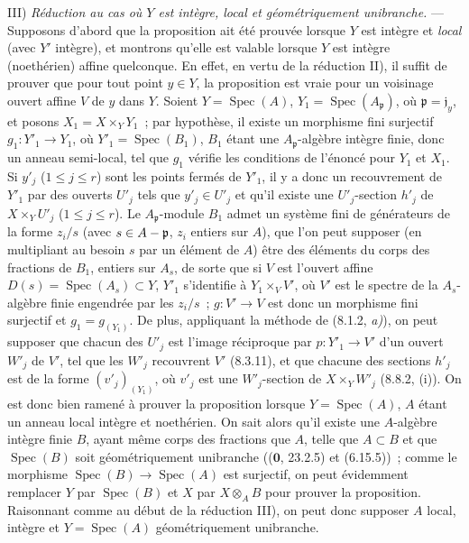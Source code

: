 III) \emph{Réduction au cas où $Y$ est intègre, local et géométriquement
unibranche.} --- Supposons d'abord que la proposition ait été prouvée lorsque $Y$
est intègre et \emph{local} (avec $Y'$ intègre), et montrons qu'elle est valable
lorsque $Y$ est intègre (noethérien) affine quelconque. En effet, en vertu de la
réduction II), il suffit de prouver que pour tout point $y\in Y$, la proposition est
vraie pour un voisinage ouvert affine $V$ de $y$ dans $Y$. Soient $Y=\operatorname{Spec}(A)$,
$Y_1=\operatorname{Spec}(A_{\mathfrak p})$, où $\mathfrak p=\mathfrak j_y$, et posons
$X_1=X\times_Y Y_1$~; par hypothèse, il existe un morphisme fini surjectif
$g_1:Y'_1\to Y_1$, où $Y'_1=\operatorname{Spec}(B_1)$, $B_1$ étant une
$A_{\mathfrak p}$-algèbre intègre finie, donc un anneau semi-local, tel que $g_1$
vérifie les conditions de l'énoncé pour $Y_1$ et $X_1$. Si $y'_j$
($1\leq j\leq r$) sont les points fermés de $Y'_1$, il y a donc un recouvrement de
$Y'_1$ par des ouverts $U'_j$ tels que $y'_j\in U'_j$ et qu'il existe une
$U'_j$-section $h'_j$ de $X\times_Y U'_j$ ($1\leq j\leq r$). Le
$A_{\mathfrak p}$-module $B_1$ admet un système fini de générateurs de la forme
$z_i/s$ (avec $s\in A-\mathfrak p$,
$z_i$ entiers sur $A$), que l'on peut supposer (en multipliant au besoin $s$ par un
élément de $A$) être des éléments du corps des fractions de $B_1$, entiers sur
$A_s$, de sorte que si $V$ est l'ouvert affine $D(s)=\operatorname{Spec}(A_s)\subset Y$, $Y'_1$
s'identifie à $Y_1\times_V V'$, où $V'$ est le spectre de la $A_s$-algèbre finie
engendrée par les $z_i/s$~; $g:V'\to V$ est donc un morphisme fini surjectif et
$g_1=g_{(Y_1)}$. De plus, appliquant la méthode de (8.1.2, \emph{a)}), on peut supposer
que chacun des $U'_j$ est l'image réciproque par $p:Y'_1\to V'$ d'un ouvert $W'_j$
de $V'$, tel que les $W'_j$ recouvrent $V'$ (8.3.11), et que chacune des sections
$h'_j$ est de la forme $(v'_j)_{(Y_1)}$, où $v'_j$ est une $W'_j$-section de
$X\times_Y W'_j$ (8.8.2, (i)). On est donc bien ramené à prouver la proposition
lorsque $Y=\operatorname{Spec}(A)$, $A$ étant un anneau local intègre et noethérien. On sait alors
qu'il existe une $A$-algèbre intègre finie $B$, ayant même corps des fractions que
$A$, telle que $A\subset B$ et que $\operatorname{Spec}(B)$ soit géométriquement unibranche
(($\mathbf 0$, 23.2.5) et (6.15.5))~; comme le morphisme
$\operatorname{Spec}(B)\to\operatorname{Spec}(A)$ est surjectif, on peut évidemment remplacer $Y$ par
$\operatorname{Spec}(B)$ et $X$ par $X\otimes_A B$ pour prouver la proposition. Raisonnant comme
au début de la réduction III), on peut donc supposer $A$ local, intègre et
$Y=\operatorname{Spec}(A)$ géométriquement unibranche.

